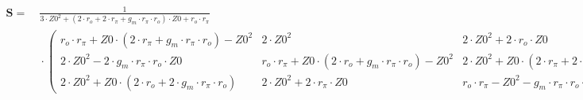 $\begin{alignedat}{1}\mathbf{S}= & \:\frac{1}{3\cdot Z0^2+ (2\cdot
r_o+2\cdot r_{\pi}+g_m\cdot r_{\pi}\cdot r_o )\cdot Z0+r_o\cdot
r_{\pi}}\\ & \:\cdot \left(\begin{smallmatrix} r_o\cdot
r_{\pi}+Z0\cdot  (2\cdot r_{\pi}+g_m\cdot r_{\pi}\cdot r_o )-Z0^2 &
2\cdot Z0^2 & 2\cdot Z0^2+2\cdot r_o\cdot Z0 \\ 2\cdot Z0^2-2\cdot
g_m\cdot r_{\pi}\cdot r_o\cdot Z0 & r_o\cdot r_{\pi}+Z0\cdot  (2\cdot
r_o+g_m\cdot r_{\pi}\cdot r_o )-Z0^2 & 2\cdot Z0^2+Z0\cdot  (2\cdot
r_{\pi}+2\cdot g_m\cdot r_{\pi}\cdot r_o ) \\ 2\cdot Z0^2+Z0\cdot
(2\cdot r_o+2\cdot g_m\cdot r_{\pi}\cdot r_o ) & 2\cdot Z0^2+2\cdot
r_{\pi}\cdot Z0 & r_o\cdot r_{\pi}-Z0^2-g_m\cdot r_{\pi}\cdot r_o\cdot
Z0 \end{smallmatrix}\right)\end{alignedat}$
